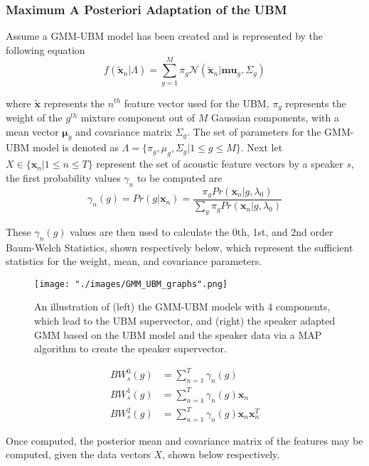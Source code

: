 \subsubsection*{Maximum A Posteriori Adaptation of the UBM}
Assume a GMM-UBM model has been created and is represented by the following equation
$$ f(\tilde{\bm{x}}_n | \Lambda) = \sum_{g = 1}^M \pi_g \mathcal{N} (\tilde{\bm{x}}_n | \bm{mu}_g, \Sigma_g)$$

where $\tilde{\bm{x}}$ represents the $n^{th}$ feature vector used for the UBM, $\pi_g$ represents the weight of the $g^{th}$ mixture component out of $M$ Gaussian components, with a mean vector $\bm{\mu}_g$ and covariance matrix $\Sigma_g$. The set of parameters for the GMM-UBM model is denoted as $\Lambda = \{ \pi_g, \mu_g, \Sigma_g | 1 \leq g \leq M \}$.
Next let $X \in \{ \bm{x}_n | 1 \leq n \leq T\}$ represent the set of acoustic feature vectors by a speaker $s$, the first probability values $\gamma_n$ to be computed are
$$\gamma_n (g) = Pr(g | \bm{x}_n) = \frac{\pi_g Pr(\bm{x}_n | g, \lambda_0)}{\sum_g \pi_g Pr(\bm{x}_n | g, \lambda_0)}$$

These $\gamma_n(g)$ values are then used to calculate the 0th, 1st, and 2nd order Baum-Welch Statistics, shown respectively below, which represent the sufficient statistics for the weight, mean, and covariance parameters.

\begin{figure}[ht]
\begin{center}
    \texttt{[image: "./images/GMM\_UBM\_graphs".png]}
    \caption{An illustration of (left) the GMM-UBM models with 4 components, which lead to the UBM supervector, and (right) the speaker adapted GMM based on the UBM model and the speaker data via a MAP algorithm to create the speaker supervector.}
    \label{fig::ubm_speaker_graph}
\end{center}
\end{figure}

\begin{align*}
    BW^0_s (g) &= \sum_{n=1}^T \gamma_n(g) \\
    BW^1_s (g) &= \sum_{n=1}^T \gamma_n(g) \bm{x}_n \\
    BW^2_s (g) &= \sum_{n=1}^T \gamma_n(g) \bm{x}_n \bm{x}_n^T
\end{align*}

Once computed, the posterior mean and covariance matrix of the features may be computed, given the data vectors $X$, shown below respectively.

